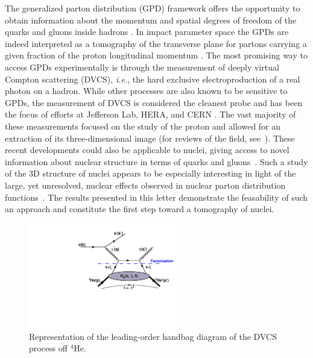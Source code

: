 \documentclass[twocolumn,nofootinbib,showpacs,prl,superscriptaddress,secnumarabic,amssymb,nobibnotes,aps,floatfix]{revtex4}
\begin{document}
The generalized parton distribution (GPD) framework offers the opportunity to 
obtain information about the momentum and spatial degrees of freedom of the 
quarks and gluons inside hadrons \cite{Mueller:1998fv,Ji:1996ek,Ji:1996nm,
Radyushkin:1996nd,Radyushkin:1997ki}. In impact parameter space the GPDs are 
indeed interpreted as a tomography of the transverse plane for partons 
carrying a given fraction of the proton longitudinal momentum 
\cite{Burkardt:2000za,Diehl:2002he,Belitsky:2002ep,Burkardt:2005hp}. The most 
promising way to access GPDs experimentally is through the measurement of 
deeply virtual Compton scattering (DVCS), \textit{i.e.}, the hard exclusive 
electroproduction of a real photon on a hadron. While other processes are also known 
to be sensitive to GPDs, the measurement of DVCS is considered the cleanest 
probe and has been the focus of efforts at Jefferson Lab, HERA, and CERN 
\cite{Stepanyan:2001sm,Airapetian,Airapetian:2010nu,Chekanov:2003ya,Aktas:2005ty,Chen:2006na,
MunozCamacho:2006hx,Girod:2007aa,Mazouz:2007aa,Gavalian:2009,Seder:2015,Defurne:2015kxq,
Pisano:2015,Jo:2015ema,Joerg:2016hhs}. The vast majority of these measurements 
focused on the study of the proton and allowed for an extraction of its 
three-dimensional image (for reviews of the field, see~\cite{Goeke:2001tz,
Diehl:2003ny,Ji:2004gf,Belitsky:2005qn,Boffi:2007yc,Guidal:2013rya}). These 
recent developments could also be applicable to nuclei, giving access to novel 
information about nuclear structure in terms of quarks and gluons~\cite{Berger:2001zb,
Cano:2003ju,Guzey:2005ba,Dupre:2015jha}. Such a study of the 3D 
structure of nuclei appears to be especially interesting in light of the large, 
yet unresolved, nuclear effects observed in nuclear parton distribution 
functions~\cite{Geesaman:1995yd,Norton:2003cb,Hen:2016kwk}. The results 
presented in this letter demonstrate the feasability of such an approach and 
constitute the first step toward a tomography of nuclei.

\begin{figure}[tb]
\includegraphics[width=6.5cm]{figs/DVCS_diagram.pdf}
\caption{Representation of the leading-order handbag diagram of the DVCS 
process off $^4$He.}
\label{fig:diags}
\end{figure}
\end{document}
